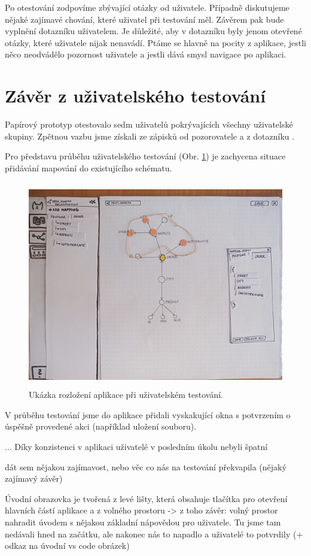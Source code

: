 Po otestování zodpovíme zbývající otázky od uživatele. Případně diskutujeme nějaké zajímavé chování, které uživatel při testování měl. Závěrem pak bude vyplnění dotazníku uživatelem. Je důležité, aby v dotazníku byly jenom otevřené otázky, které uživatele nijak nenavádí. Ptáme se hlavně na pocity z aplikace, jestli něco neodvádělo pozornost uživatele a jestli dává smysl navigace po aplikaci.

\section{Závěr z uživatelského testování}

Papírový prototyp otestovalo sedm uživatelů pokrývajících všechny uživatelské skupiny. Zpětnou vazbu jsme získali ze zápisků od pozorovatele a z dotazníku .

Pro představu průběhu uživatelského testování (Obr. \ref{obr05:ukazka-testovani}) je zachycena situace přidávání mapování do existujícího schématu.

\begin{figure}[htb]
  \centering
  \includegraphics[height=90mm]{../img/ukazka-testovani}
  \caption{Ukázka rozložení aplikace při uživatelském testování.}
  \label{obr05:ukazka-testovani}
\end{figure}

V průběhu testování jsme do aplikace přidali vyskakující okna s potvrzením o úspěšně provedené akci (například uložení souboru). 


... Díky konzistenci v aplikaci uživatelé v posledním úkolu nebyli špatní

dát sem nějakou zajímavost, nebo věc co nás na testování překvapila (nějaký zajímavý závěr)

Úvodní obrazovka je tvořená z levé lišty, která obsahuje tlačítka pro otevření hlavních částí aplikace a z volného prostoru -> z toho závěr: volný prostor nahradit úvodem s nějakou základní nápovědou pro uživatele. Tu jsme tam nedávali hned na začátku, ale nakonec nás to napadlo a uživatelé to potvrdily (+ odkaz na úvodní vs code obrázek)